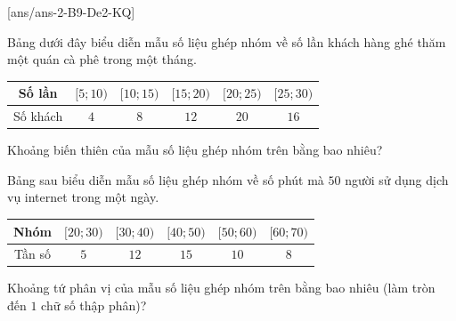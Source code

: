 [ans/ans-2-B9-De2-KQ]
\caukq
\begin{ex}%
	Bảng dưới đây biểu diễn mẫu số liệu ghép nhóm về số lần khách hàng ghé thăm một quán cà phê trong một tháng.
	\begin{center}
		\begin{tabular}{|c|c|c|c|c|c|}
			\hline Số lần & $[5 ; 10)$ & $[10 ; 15)$ & $[15 ; 20)$ & $[20 ; 25)$ & $[25 ; 30)$ \\
			\hline Số khách & $4$ & $8$ & $12$ & $20$ & $16$ \\
			\hline
		\end{tabular}
	\end{center}
	Khoảng biến thiên của mẫu số liệu ghép nhóm trên bằng bao nhiêu?
\end{ex}
\begin{ex}%
	Bảng sau biểu diễn mẫu số liệu ghép nhóm về số phút mà $50$ người sử dụng dịch vụ internet trong một ngày.
	\begin{center}
		\begin{tabular}{|c|c|c|c|c|c|}
			\hline Nhóm  & $[20 ; 30)$ & $[30 ; 40)$ & $[40 ; 50)$ & $[50 ; 60)$ & $[60 ; 70)$ \\
			\hline Tần số & $5$ & $12$ & $15$ & $10$ & $8$ \\
			\hline
		\end{tabular}
	\end{center}
	Khoảng tứ phân vị của mẫu số liệu ghép nhóm trên bằng bao nhiêu (làm tròn đến $1$ chữ số thập phân)?
\end{ex}
